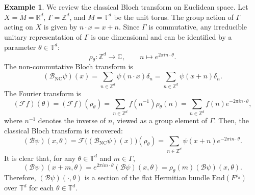 \documentclass[11pt,oneside,reqno]{amsart}
\theoremstyle{definition}
\newtheorem{example}[definition]{Example}
\numberwithin{equation}{section}
\theoremstyle{plain}
\begin{document}
\begin{example}
    We review the classical Bloch transform on Euclidean space. Let $X=\widetilde{M}=\mathbb{R}^{d}$, $\Gamma=\mathbb{Z}^{d}$, and $M=\mathbb{T}^d$ be the unit torus. The group action of $\Gamma$ acting on $X$ is given by $n\cdot x = x+n$. Since $\Gamma$ is commutative, any irreducible unitary representation of $\Gamma$ is one dimensional and can be identified by a parameter $\theta \in \mathbb{T}^d$:
    \begin{equation*}
        \rho_\theta:\mathbb{Z}^d \rightarrow\mathbb{C}, \qquad n\mapsto e^{2\pi i n\cdot \theta}.
    \end{equation*}
    The non-commutative Bloch transform is
    \begin{equation*}
        (\mathcal{B}_{\mathrm{NC}} \psi)(x)=\sum_{n\in \mathbb{Z}^d} \psi(n\cdot x) \delta_n = \sum_{n\in \mathbb{Z}^d} \psi(x+n) \delta_n.
    \end{equation*}
   The Fourier transform is
\begin{equation*}
    (\mathcal{F}f)(\theta)=(\mathcal{F}f)(\rho_\theta)=\sum_{n\in \mathbb{Z}^d}f(n^{-1}) \rho_\theta(n) =   \sum_{n\in \mathbb{Z}^d}f(n) e^{-2\pi i n\cdot \theta},
\end{equation*}
where $n^{-1}$ denotes the inverse of $n$, viewed as a group element of $\Gamma$. Then, the classical Bloch transform is recovered:
\begin{equation}
    (\mathcal{B}\psi)(x,\theta)=\mathcal{F}\big((\mathcal{B}_{\mathrm{NC}}\psi)(x) \big)(\rho_\theta)=\sum_{n\in \mathbb{Z}^d}\psi(x+n)e^{-2\pi i n\cdot \theta}.
\end{equation}
It is clear that, for any $\theta \in \mathbb{T}^{d}$ and $m \in \Gamma$, 
\begin{equation*}
    (\mathcal{B}\psi)(x+m,\theta)=e^{2\pi i m\cdot \theta} (\mathcal{B}\psi)(x,\theta)=\rho_{\theta}(m)(\mathcal{B}\psi)(x,\theta).
\end{equation*}
Therefore, $(\mathcal{B}\psi)(\cdot,\theta)$ is a section of the flat Hermitian bundle $\mathrm{End}(F^{\rho_\theta})$ over $\mathbb{T}^d$ for each $\theta \in \mathbb{T}^d$.
\end{example}



\end{document}
